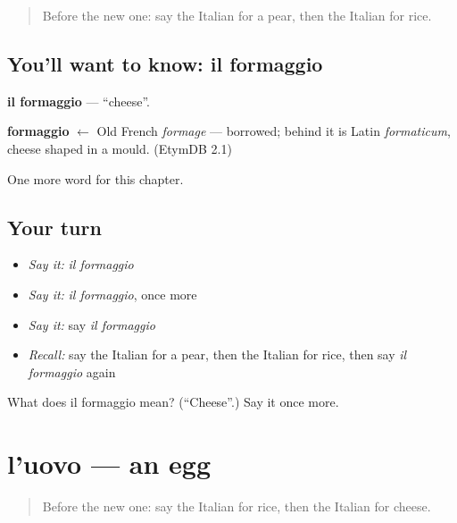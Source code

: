 \label{lesson:IT-C55-formaggio}



\begin{quote}
Before the new one: say the Italian for a pear, then the Italian for rice.
\end{quote}

\subsection*{You'll want to know: il formaggio}
\textbf{il formaggio} — \textquotedblleft{}cheese\textquotedblright{}.

\begin{cousinweb}
\textbf{formaggio} $\leftarrow$ Old French \emph{formage} — borrowed; behind it is Latin \emph{formaticum}, cheese shaped in a mould. (EtymDB 2.1)
\end{cousinweb}

\begin{grammarlens}[title={What you've built}]
One more word for this chapter.
\end{grammarlens}

\subsection*{Your turn}
\begin{itemize}
\raggedright
  \item \emph{Say it:} \emph{il formaggio}
  \item \emph{Say it:} \emph{il formaggio}, once more
  \item \emph{Say it:} say \emph{il formaggio}
  \item \emph{Recall:} say the Italian for a pear, then the Italian for rice, then say \emph{il formaggio} again
\end{itemize}

\begin{tcolorbox}[breakable,colback=teal!4,colframe=teal!35!black,title={Before you move on}]
What does il formaggio mean? (\textquotedblleft{}Cheese\textquotedblright{}.) Say it once more.
\end{tcolorbox}
\section[l'uovo]{l'uovo — an egg}

\label{lesson:IT-C55-uovo}



\begin{quote}
Before the new one: say the Italian for rice, then the Italian for cheese.
\end{quote}

